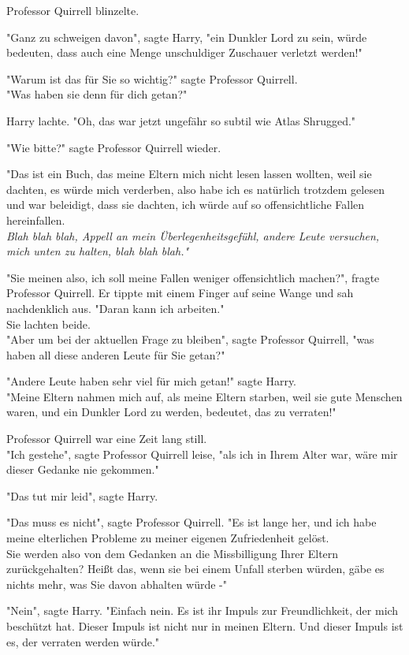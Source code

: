 {Professor Quirrell blinzelte.

"Ganz zu schweigen davon", sagte Harry, "ein Dunkler Lord zu sein, würde bedeuten, dass auch eine Menge unschuldiger Zuschauer verletzt werden!"

"Warum ist das für Sie so wichtig?" sagte Professor Quirrell.\\ "Was haben sie denn für dich getan?"

Harry lachte. "Oh, das war jetzt ungefähr so subtil wie Atlas Shrugged."

"Wie bitte?" sagte Professor Quirrell wieder.

"Das ist ein Buch, das meine Eltern mich nicht lesen lassen wollten, weil sie dachten, es würde mich verderben, also habe ich es natürlich trotzdem gelesen und war beleidigt, dass sie dachten, ich würde auf so offensichtliche Fallen hereinfallen.\\ \emph{Blah blah blah, Appell an mein Überlegenheitsgefühl, andere Leute versuchen, mich unten zu halten, blah blah blah."}

"Sie meinen also, ich soll meine Fallen weniger offensichtlich machen?", fragte Professor Quirrell. Er tippte mit einem Finger auf seine Wange und sah nachdenklich aus. "Daran kann ich arbeiten."\\ Sie lachten beide.\\ "Aber um bei der aktuellen Frage zu bleiben", sagte Professor Quirrell, "was haben all diese anderen Leute für Sie getan?"

"Andere Leute haben sehr viel für mich getan!" sagte Harry.\\ "Meine Eltern nahmen mich auf, als meine Eltern starben, weil sie gute Menschen waren, und ein Dunkler Lord zu werden, bedeutet, das zu verraten!"

Professor Quirrell war eine Zeit lang still.\\ "Ich gestehe", sagte Professor Quirrell leise, "als ich in Ihrem Alter war, wäre mir dieser Gedanke nie gekommen."

"Das tut mir leid", sagte Harry.

"Das muss es nicht", sagte Professor Quirrell. "Es ist lange her, und ich habe meine elterlichen Probleme zu meiner eigenen Zufriedenheit gelöst.\\ Sie werden also von dem Gedanken an die Missbilligung Ihrer Eltern zurückgehalten? Heißt das, wenn sie bei einem Unfall sterben würden, gäbe es nichts mehr, was Sie davon abhalten würde -"

"Nein", sagte Harry. "Einfach nein. Es ist ihr Impuls zur Freundlichkeit, der mich beschützt hat. Dieser Impuls ist nicht nur in meinen Eltern. Und dieser Impuls ist es, der verraten werden würde."

}

